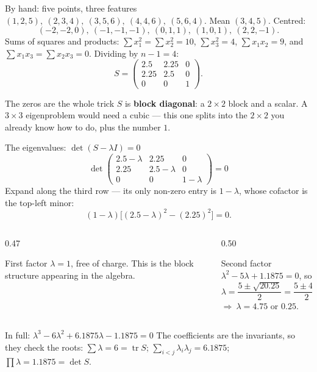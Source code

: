 \documentclass[aspectratio=169]{beamer}
\begin{document}
\begin{frame}[shrink=8]{By hand: five points, three features}
  $(1,2,5),\ (2,3,4),\ (3,5,6),\ (4,4,6),\ (5,6,4)$. Mean $(3,4,5)$. Centred:
  \[
    (-2,-2,0),\ (-1,-1,-1),\ (0,1,1),\ (1,0,1),\ (2,2,-1).
  \]
  Sums of squares and products:
  $\sum x_1^2 = \sum x_2^2 = 10$, $\sum x_3^2 = 4$, $\sum x_1x_2 = 9$, and
  \textbf{$\sum x_1x_3 = \sum x_2x_3 = 0$}. Dividing by $n-1=4$:
  \[
    S = \begin{pmatrix}
      2.5 & 2.25 & 0\\ 2.25 & 2.5 & 0\\ 0 & 0 & 1
    \end{pmatrix}.
  \]
  \begin{block}{The zeros are the whole trick}
    \small $S$ is \textbf{block diagonal}: a $2\times2$ block and a scalar.
    A $3\times3$ eigenproblem would need a cubic --- this one splits into the
    $2\times2$ you already know how to do, plus the number $1$.
  \end{block}
\end{frame}

\begin{frame}[shrink=10]{The eigenvalues: $\det(S - \lambda I) = 0$}
  \[
    \det\!\begin{pmatrix}
      2.5-\lambda & 2.25 & 0\\ 2.25 & 2.5-\lambda & 0\\ 0 & 0 & 1-\lambda
    \end{pmatrix} = 0
  \]
  Expand along the third row --- its only non-zero entry is $1-\lambda$, whose
  cofactor is the top-left minor:
  \[
    (1-\lambda)\bigl[(2.5-\lambda)^2 - (2.25)^2\bigr] = 0 .
  \]
  \vspace{-0.3em}
  \begin{columns}[T]
    \begin{column}{0.47\textwidth}
      \begin{block}{First factor}
        \small $\lambda = 1$, free of charge. This is the block structure
        appearing in the algebra.
      \end{block}
    \end{column}
    \begin{column}{0.50\textwidth}
      \begin{block}{Second factor}
        \small $\lambda^2 - 5\lambda + 1.1875 = 0$, so
        \[
          \lambda = \frac{5 \pm \sqrt{20.25}}{2} = \frac{5 \pm 4.5}{2}
        \]
        $\Rightarrow\ \lambda = 4.75$ or $0.25$.
      \end{block}
    \end{column}
  \end{columns}
  \vspace{0.2em}
  \begin{alertblock}{In full: $\lambda^3 - 6\lambda^2 + 6.1875\lambda - 1.1875 = 0$}
    \footnotesize The coefficients are the invariants, so they check the roots:
    $\sum\lambda = 6 = \operatorname{tr}S$;
    $\sum_{i<j}\lambda_i\lambda_j = 6.1875$;
    $\prod\lambda = 1.1875 = \det S$.
  \end{alertblock}
\end{frame}
\end{document}
